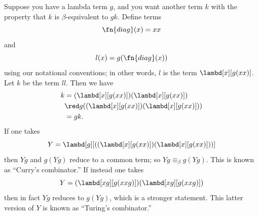 \documentclass[../../../include/open-logic-section]{subfiles}
\begin{document}

Suppose you have a lambda term $g$, and you want another term $k$ with
the property that $k$ is $\beta$-equivalent to $gk$. Define terms
\[
\fn{diag}(x) = xx
\]
and
\[
l(x) = g(\fn{diag}(x))
\]
using our notational conventions; in other words, $l$ is the term
$\lambd[x][g(xx)]$. Let $k$ be the term $ll$. Then we have
\begin{align*}
k & = (\lambd[x][g(xx)])(\lambd[x][g(xx)]) \\
& \red  g((\lambd[x][g(xx)])(\lambd[x][g(xx)])) \\
& = gk.
\end{align*}
If one takes
\[
Y = \lambd[g][((\lambd[x][g(xx)])(\lambd[x][g(xx)]))]
\]
then $Yg$ and $g(Yg)$ reduce to a common term; so $Yg \equiv_\beta
g(Yg)$. This is known as ``Curry's combinator.'' If instead one takes
\[
Y = (\lambd[xg][g(xxg)])(\lambd[xg][g(xxg)])
\]
then in fact $Yg$ reduces to $g(Yg)$, which is a stronger statement.
This latter version of $Y$ is known as ``Turing's combinator.''
\end{document}
